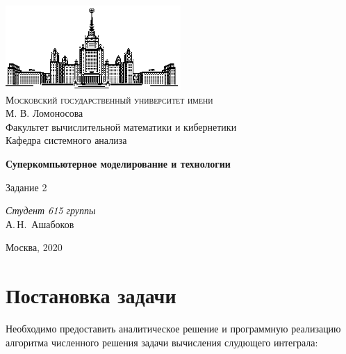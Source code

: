 \documentclass[a4paper, 12pt]{article}
\begin{document}
\thispagestyle{empty}

\begin{center}
\vspace{-3cm}
\includegraphics[width=0.5\textwidth]{sources/msu.eps}\\
{\scshape Московский государственный университет имени}\\
М. В. Ломоносова\\
Факультет вычислительной математики и кибернетики\\
Кафедра системного анализа

\vfill


\vspace{1cm}

{\Huge\bfseries Суперкомпьютерное моделирование и технологии}\\

\vspace{1cm}

{\LARGE Задание 2}
\end{center}

\vspace{1cm}

\begin{flushright}
  \large
  \textit{Студент 615 группы}\\
  А.\,Н.~Ашабоков

  \vspace{5mm}

\end{flushright}

\vfill

\begin{center}
Москва, 2020
\end{center}

\newpage
\setcounter{tocdepth}{2}
\tableofcontents

\newpage
\normalsize

\section{Постановка задачи}

    Необходимо предоставить аналитическое решение и программную реализацию алгоритма численного решения задачи вычисления слудющего интеграла:
    
\end{document}
